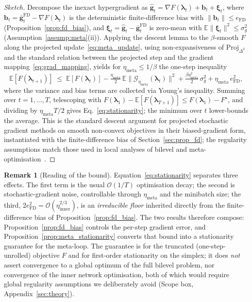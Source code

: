 \documentclass[10pt]{article}
\theoremstyle{plain}
\theoremstyle{definition}
\newtheorem{remark}{Remark}
\begin{document}
\begin{proof}[Sketch]
Decompose the inexact hypergradient as $\widehat{\mathbf{g}}_t=\nabla F(\boldsymbol{\lambda}_t)+\mathbf{b}_t+\boldsymbol{\xi}_t$, where $\mathbf{b}_t=\bar{\mathbf{g}}_t^{\mathrm{FD}}-\nabla F(\boldsymbol{\lambda}_t)$ is the deterministic finite-difference bias with $\|\mathbf{b}_t\|\le e_{\mathrm{FD}}$ (Proposition~\ref{prop:fd_bias}), and $\boldsymbol{\xi}_t=\widehat{\mathbf{g}}_t-\bar{\mathbf{g}}_t^{\mathrm{FD}}$ is zero-mean with $\mathbb{E}\|\boldsymbol{\xi}_t\|^{2}\le\sigma_g^{2}$ (Assumption~\ref{assump:meta}(ii)). Applying the descent lemma to the $\beta$-smooth $F$ along the projected update~\eqref{eq:meta_update}, using non-expansiveness of $\mathrm{Proj}_{\Delta^{3}}$ and the standard relation between the projected step and the gradient mapping~\eqref{eq:grad_mapping}, yields for $\eta_{\mathrm{meta}}\le 1/\beta$ the one-step inequality
\[
\mathbb{E}[F(\boldsymbol{\lambda}_{t+1})] \;\le\; \mathbb{E}[F(\boldsymbol{\lambda}_t)] - \tfrac{\eta_{\mathrm{meta}}}{2}\,\mathbb{E}\|\mathcal{G}_{\eta_{\mathrm{meta}}}(\boldsymbol{\lambda}_t)\|^{2} + \tfrac{\beta\eta_{\mathrm{meta}}^{2}}{2}\,\sigma_g^{2} + \eta_{\mathrm{meta}}\,e_{\mathrm{FD}}^{2},
\]
where the variance and bias terms are collected via Young's inequality. Summing over $t=1,\dots,T$, telescoping with $F(\boldsymbol{\lambda}_1)-\mathbb{E}[F(\boldsymbol{\lambda}_{T+1})]\le F(\boldsymbol{\lambda}_1)-F^{\star}$, and dividing by $\eta_{\mathrm{meta}}T/2$ gives Eq.~\eqref{eq:stationarity}; the minimum over $t$ lower-bounds the average. This is the standard descent argument for projected stochastic gradient methods on smooth non-convex objectives in their biased-gradient form, instantiated with the finite-difference bias of Section~\ref{sec:prop_fd}; the regularity assumptions match those used in local analyses of bilevel and meta-optimisation~\citep{franceschi2018bilevel,liu2021investigating}.
\end{proof}

\begin{remark}[Reading of the bound]
Equation~\eqref{eq:stationarity} separates three effects. The first term is the usual $\mathcal{O}(1/T)$ optimisation decay; the second is stochastic-gradient noise, controllable through $\eta_{\mathrm{meta}}$ and the minibatch size; the third, $2e_{\mathrm{FD}}^{2}=\mathcal{O}(\eta_{\mathrm{inner}}^{2/3})$, is an \emph{irreducible floor} inherited directly from the finite-difference bias of Proposition~\ref{prop:fd_bias}. The two results therefore compose: Proposition~\ref{prop:fd_bias} controls the per-step gradient error, and Proposition~\ref{prop:meta_stationarity} converts that bound into a stationarity guarantee for the meta-loop. The guarantee is for the truncated (one-step-unrolled) objective $F$ and for first-order stationarity on the simplex; it does \emph{not} assert convergence to a global optimum of the full bilevel problem, nor convergence of the inner network optimisation, both of which would require global regularity assumptions we deliberately avoid (Scope box, Appendix~\ref{sec:theory}).
\end{remark}
\end{document}
